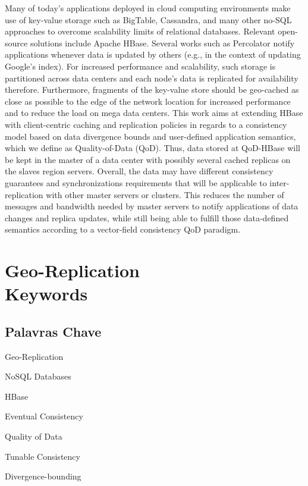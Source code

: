Many of today's applications deployed in cloud computing environments make use of key-value storage such as BigTable, Cassandra, and many other no-SQL approaches to overcome scalability limits of relational databases. Relevant open-source solutions include Apache HBase. Several works such as Percolator notify applications whenever data is updated by others (e.g., in the context of updating Google's index). For increased performance and scalability, such storage is partitioned across data centers and each node's data is replicated for availability therefore. Furthermore, fragments of the key-value store should be geo-cached as close as possible to the edge of the network location for increased performance and to reduce the load on mega data centers. This work aims at extending HBase with client-centric caching and replication policies in regards to a consistency model based on data divergence bounds and user-defined application semantics, which we define as Quality-of-Data (QoD). Thus, data stored at QoD-HBase will be kept in the master of a data center with possibly several cached replicas on the slaves region servers. Overall, the data may have different consistency guarantees and synchronizations requirements that will be applicable to inter-replication with other master servers or clusters. This reduces the number of messages and bandwidth needed by master servers to notify applications of data changes and replica updates, while still being able to fulfill those data-defined semantics according to a vector-field consistency QoD paradigm.

\newpage


\chapter*{Geo-Replication \\ Keywords}
\thispagestyle{empty}

\section*{Palavras Chave}
{\large %

\noindent Geo-Replication

\noindent NoSQL Databases

\noindent HBase

\noindent Eventual Consistency

\noindent Quality of Data

\noindent Tunable Consistency

\noindent Divergence-bounding

}

